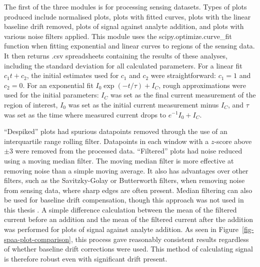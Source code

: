 \documentclass[
  a4paper,
]{scrbook}
\begin{document}
The first of the three modules is for processing sensing datasets. Types
of plots produced include normalised plots, plots with fitted curves,
plots with the linear baseline drift removed, plots of signal against
analyte addition, and plots with various noise filters applied. This
module uses the scipy.optimize.curve\_fit function when fitting
exponential and linear curves to regions of the sensing data. It then
returns .csv spreadsheets containing the results of these analyses,
including the standard deviation for all calculated parameters. For a
linear fit \(c_1t + c_2\), the initial estimates used for \(c_1\) and
\(c_2\) were straightforward: \(c_1=1\) and \(c_2=0\). For an
exponential fit \(I_0\exp{(-t/\tau)} + I_C\), rough approximations were
used for the initial parameters: \(I_C\) was set as the final current
measurement of the region of interest, \(I_0\) was set as the initial
current measurement minus \(I_C\), and \(\tau\) was set as the time
where measured current drops to \(e^{-1}I_0 + I_C\).

``Despiked'' plots had spurious datapoints removed through the use of an
interquartile range rolling filter. Datapoints in each window with a
\(z\)-score above \(\pm 3\) were removed from the processed data.
``Filtered'' plots had noise reduced using a moving median filter. The
moving median filter is more effective at removing noise than a simple
moving average. It also has advantages over other filters, such as the
Savitzky-Golay or Butterworth filters, when removing noise from sensing
data, where sharp edges are often present. Median filtering can also be
used for baseline drift compensation, though this approach was not used
in this thesis \autocite{Stone2011}. A simple difference calculation
between the mean of the filtered current before an addition and the mean
of the filtered current after the addition was performed for plots of
signal against analyte addition. As seen in
Figure~\ref{fig-spaa-plot-comparison}, this process gave reasonably
consistent results regardless of whether baseline drift corrections were
used. This method of calculating signal is therefore robust even with
significant drift present.
\end{document}
